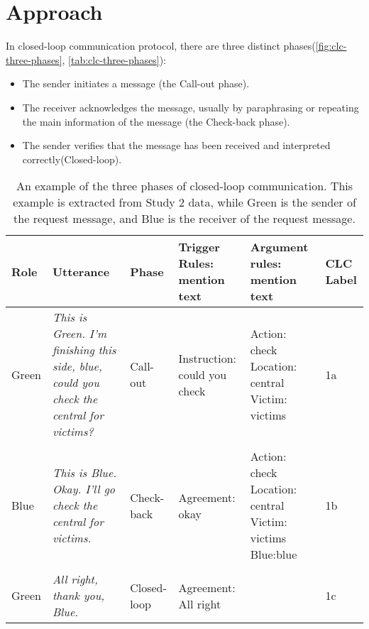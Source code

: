 \section{Approach}

In closed-loop communication protocol, there are three distinct
phases\citep{Hargestam.ea:2013}(\autoref{fig:clc-three-phases},
\autoref{tab:clc-three-phases}): 

\begin{itemize}

    \item The sender initiates a message (the Call-out phase).

    \item The receiver acknowledges the message, usually by paraphrasing or
        repeating the main information of the message (the Check-back phase).

    \item The sender verifies that the message has been received and
        interpreted correctly(Closed-loop).

\end{itemize}

\newcommand{\utteranceone}{\textit{This is Green. I’m finishing this side, blue, could you check the central for victims? }} 
\newcommand{\utterancetwo}{\textit{This is Blue. Okay. I’ll go check the central for victims.}}
\newcommand{\utterancethree}{\textit{All right, thank you, Blue.}}

\begin{table}
    \small
    \centering
    \begin{tabularx}{6in}{lXlp{1.2in}p{1.2in}p{0.4in}}
        \toprule
        Role  & Utterance         & Phase       & Trigger Rules: mention text  & Argument rules: mention text                                                         & CLC Label\\\midrule
        Green & \utteranceone{}   & Call-out    & Instruction: could you check & Action: check \newline Location: central \newline Victim: victims                    & 1a\\\\
        Blue  & \utterancetwo{}   & Check-back  & Agreement: okay              & Action: check \newline Location: central \newline Victim: victims \newline Blue:blue & 1b\\\\
        Green & \utterancethree{} & Closed-loop & Agreement: All right         &                                                                                      & 1c\\
        \bottomrule
    \end{tabularx}
    \caption{%
        An example of the three phases of closed-loop communication. This
        example is extracted from Study 2 data, while Green is the sender of the
        request message, and Blue is the receiver of the request message.
    }
    \label{tab:clc-three-phases}
\end{table}

